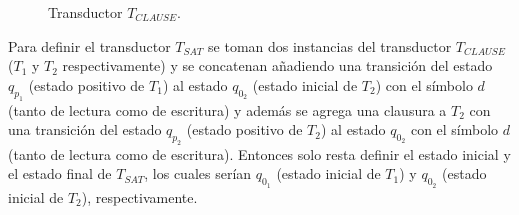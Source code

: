 \documentclass[12pt]{article}
\begin{document}
\begin{figure}[h]
    \centering  \begin{otherlanguage}{english}
    \end{otherlanguage}
    \caption{Transductor $T_{CLAUSE}$.}
    \label{fig:transducer_clause} %
\end{figure}

Para definir el transductor $T_{SAT}$ se toman dos instancias del transductor $T_{CLAUSE}$ ($T_1$ y $T_2$ respectivamente) y se concatenan añadiendo una transición del estado $q_{p_1}$ (estado positivo de $T_1$) al estado $q_{0_2}$ (estado inicial de $T_2$) con el símbolo $d$ (tanto de lectura como de escritura) y además se agrega una clausura a $T_2$ con una transición del estado $q_{p_2}$ (estado positivo de $T_2$) al estado $q_{0_2}$ con el símbolo $d$ (tanto de lectura como de escritura). Entonces solo resta definir el estado inicial y el estado final de $T_{SAT}$, los cuales serían $q_{0_1}$ (estado inicial de $T_1$) y $q_{0_2}$ (estado inicial de $T_2$), respectivamente.
\end{document}
